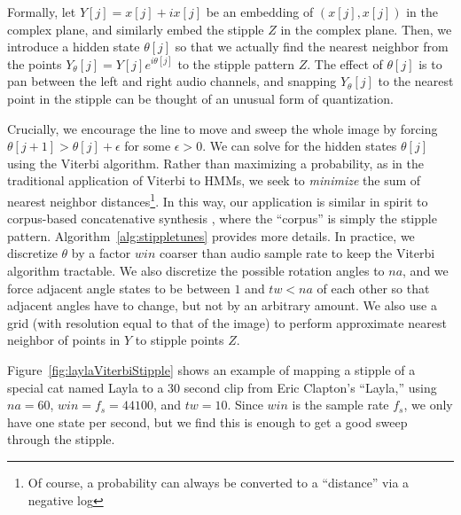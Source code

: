 \documentclass{article}
\begin{document}
Formally, let $Y[j] = x[j] + i x[j]$ be an embedding of $(x[j], x[j])$ in the complex plane, and similarly embed the stipple $Z$ in the complex plane.  Then, we introduce a hidden state $\theta[j]$ so that we actually find the nearest neighbor from the points $Y_{\theta}[j] = Y[j] e^{i \theta[j]}$ to the stipple pattern $Z$.  The effect of $\theta[j]$ is to pan between the left and right audio channels, and snapping $Y_{\theta}[j]$ to the nearest point in the stipple can be thought of an unusual form of quantization.  


Crucially, we encourage the line to move and sweep the whole image by forcing $\theta[j+1] > \theta[j] + \epsilon$ for some $\epsilon > 0$.  We can solve for the hidden states $\theta[j]$ using the Viterbi algorithm.  Rather than maximizing a probability, as in the traditional application of Viterbi to HMMs, we seek to {\em minimize} the sum of nearest neighbor distances\footnote{Of course, a probability can always be converted to a ``distance'' via a negative log}.  In this way, our application is similar in spirit to corpus-based concatenative synthesis \cite{schwarz2007corpus}, where the ``corpus'' is simply the stipple pattern.  Algorithm~\ref{alg:stippletunes} provides more details. In practice, we discretize $\theta$ by a factor $win$ coarser than audio sample rate to keep the Viterbi algorithm tractable.  We also discretize the possible rotation angles to $na$, and we force adjacent angle states to be between $1$ and $tw < na$ of each other so that adjacent angles have to change, but not by an arbitrary amount.  We also use a grid (with resolution equal to that of the image) to perform approximate nearest neighbor of points in $Y$ to stipple points $Z$.


Figure~\ref{fig:laylaViterbiStipple} shows an example of mapping a stipple of a special cat named Layla to a 30 second clip from Eric Clapton's ``Layla,'' using $na=60$, $win=f_s=44100$, and $tw=10$.  Since $win$ is the sample rate $f_s$, we only have one state per second, but we find this is enough to get a good sweep through the stipple.
\end{document}
